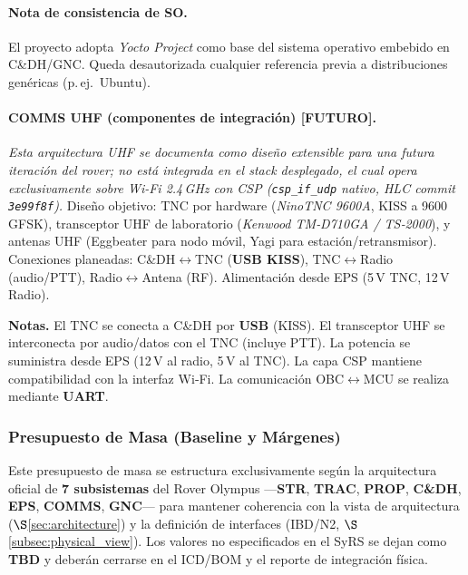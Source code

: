 \paragraph{Nota de consistencia de SO.}
El proyecto adopta \emph{Yocto Project} como base del sistema operativo embebido en C\&DH/GNC.
Queda desautorizada cualquier referencia previa a distribuciones genéricas (p.\,ej.\ Ubuntu).

\paragraph{COMMS UHF (componentes de integración) \textbf{[FUTURO]}.}
\textit{Esta arquitectura UHF se documenta como diseño extensible para una futura iteración del rover; no está integrada en el stack desplegado, el cual opera exclusivamente sobre Wi-Fi 2.4\,GHz con CSP (\texttt{csp\_if\_udp} nativo, HLC commit \texttt{3e99f8f}).} Diseño objetivo: TNC por hardware (\emph{NinoTNC 9600A}, KISS a 9600\,GFSK), transceptor UHF de laboratorio (\emph{Kenwood TM‑D710GA / TS‑2000}), y antenas UHF (Eggbeater para nodo móvil, Yagi para estación/retransmisor). Conexiones planeadas: C\&DH$\leftrightarrow$TNC (\textbf{USB KISS}), TNC$\leftrightarrow$Radio (audio/PTT), Radio$\leftrightarrow$Antena (RF). Alimentación desde EPS (5\,V TNC, 12\,V Radio).

\noindent\textbf{Notas.} El TNC se conecta a C\&DH por \textbf{USB} (KISS). El transceptor UHF se
interconecta por audio/datos con el TNC (incluye PTT). La potencia se suministra desde EPS
(12\,V al radio, 5\,V al TNC). La capa CSP mantiene compatibilidad con la interfaz Wi‑Fi.
La comunicación OBC$\leftrightarrow$MCU se realiza mediante \textbf{UART}.



\subsubsection{Presupuesto de Masa (Baseline y Márgenes)}
\label{sec:mass_budget}

Este presupuesto de masa se estructura exclusivamente según la arquitectura oficial de \textbf{7 subsistemas} del Rover Olympus —\textbf{STR}, \textbf{TRAC}, \textbf{PROP}, \textbf{C\&DH}, \textbf{EPS}, \textbf{COMMS}, \textbf{GNC}— para mantener coherencia con la vista de arquitectura ($\S$\ref{sec:architecture}) y la definición de interfaces (IBD/N2, $\S$\ref{subsec:physical_view}). Los valores no especificados en el SyRS se dejan como \textbf{TBD} y deberán cerrarse en el ICD/BOM y el reporte de integración física. \cite{nasa_cm, segoldmine_ppi}

